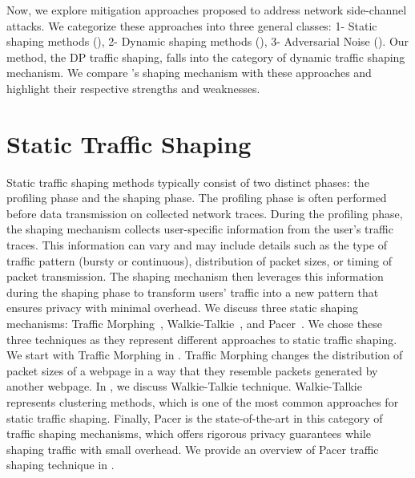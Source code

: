 Now, we explore mitigation approaches proposed to address network side-channel attacks. 
We categorize these approaches into three general classes: 1- Static shaping methods (), 2- Dynamic shaping methods (), 3- Adversarial Noise ().
Our method, the DP traffic shaping, falls into the category of dynamic traffic shaping mechanism. 
We compare {\sys}'s shaping mechanism with these approaches and highlight their respective strengths and weaknesses.



\section{Static Traffic Shaping}\label{subsec:static-traffic-shaping}
Static traffic shaping methods typically consist of two distinct phases: the profiling phase and the shaping phase.
The profiling phase is often performed before data transmission on collected network traces.  
During the profiling phase, the shaping mechanism collects user-specific information from the user's traffic traces.
This information can vary and may include details such as the type of traffic pattern (\ie bursty or continuous), distribution of packet sizes, or timing of packet transmission.
The shaping mechanism then leverages this information during the shaping phase to transform users' traffic into a new pattern that ensures privacy with minimal overhead.
We discuss three static shaping mechanisms: Traffic Morphing~\cite{wright2009traffic}, Walkie-Talkie~\cite{wang2017walkie}, and Pacer~\cite{mehta2022pacer}.
We chose these three techniques as they represent different approaches to static traffic shaping.
We start with Traffic Morphing in .
Traffic Morphing changes the distribution of packet sizes of a webpage in a way that they resemble packets generated by another webpage.
In , we discuss Walkie-Talkie technique.
Walkie-Talkie represents clustering methods, which is one of the most common approaches for static traffic shaping.
Finally, Pacer is the state-of-the-art in this category of traffic shaping mechanisms, which offers rigorous privacy guarantees while shaping traffic with small overhead.
We provide an overview of Pacer traffic shaping technique in .   

